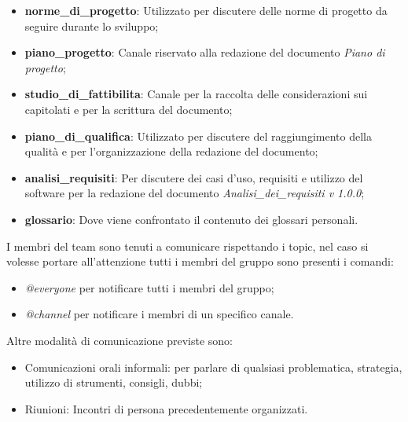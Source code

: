             \begin{itemize}
                \item \textbf{norme_di_progetto}: Utilizzato per discutere delle norme di progetto da seguire durante lo sviluppo;
                \item \textbf{piano_progetto}: Canale riservato alla redazione del documento \textit{Piano di progetto};
                \item \textbf{studio_di_fattibilita}: Canale per la raccolta delle considerazioni sui capitolati e per la scrittura del documento;
                \item \textbf{piano_di_qualifica}: Utilizzato per discutere del raggiungimento della qualità e per l'organizzazione della redazione del documento;
                \item \textbf{analisi_requisiti}: Per discutere dei casi d'uso, requisiti e utilizzo del software per la redazione del documento \textit{Analisi_dei_requisiti v 1.0.0}; 
                \item \textbf{glossario}: Dove viene confrontato il contenuto dei glossari personali.
            \end{itemize}
            \newline
            I membri del team sono tenuti a comunicare rispettando i topic, nel caso si volesse portare all'attenzione tutti i membri del gruppo sono presenti i comandi:
            \begin{itemize}
                \item \textit{@everyone} per notificare tutti i membri del gruppo;
                \item \textit{@channel} per notificare i membri di un specifico canale.
            \end{itemize}
            
            \newline
            Altre modalità di comunicazione previste sono:
            \begin{itemize}
                \item Comunicazioni orali informali: per parlare di qualsiasi problematica, strategia, utilizzo di strumenti, consigli, dubbi;
                \item Riunioni: Incontri di persona precedentemente organizzati.
            \end{itemize}        
